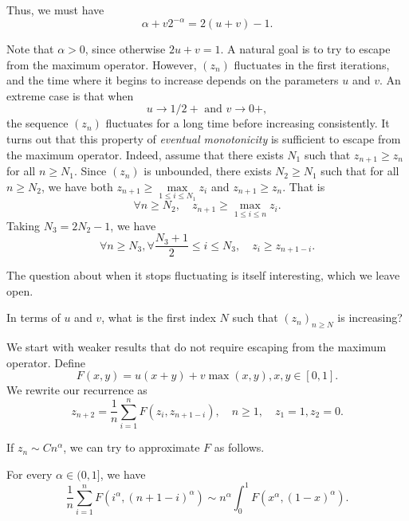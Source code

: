 Thus, we must have
\begin{equation}
  \label{eq:alpha-equation}
  \alpha + v2^{-\alpha} = 2(u+v) - 1.
\end{equation}

Note that $\alpha>0$, since otherwise $2u+v = 1$. A natural goal is to try to escape from the maximum operator. However, $(z_n)$ fluctuates in the first iterations, and the time where it begins to increase depends on the parameters $u$ and $v$. An extreme case is that when
$$u\to1/2+ \text{ and } v\to0+,$$
the sequence $(z_n)$ fluctuates for a long time before increasing consistently. It turns out that this property of \textit{eventual monotonicity} is sufficient to escape from the maximum operator. Indeed, assume that there exists $N_1$ such that $z_{n+1} \ge z_n$ for all $n \ge N_1$. Since $(z_n)$ is unbounded, there exists $N_2 \ge N_1$ such that for all $n \ge N_2$, we have both $z_{n+1} \ge \max\limits_{1\le i \le N_1} z_i$ and $z_{n+1} \ge z_n$. That is
$$\forall n \ge N_2, \quad z_{n+1} \ge \max_{1 \le i \le n} z_i.$$
Taking $N_3 = 2N_2-1$, we have
$$\forall n \ge N_3, \forall \dfrac{N_3+1}{2}\le i \le N_3, \quad z_{i} \ge z_{n+1-i}.$$

The question about when it stops fluctuating is itself interesting, which we leave open.
\begin{openquestion}
  \label{open:when-eventually-increasing}
  In terms of $u$ and $v$, what is the first index $N$ such that $(z_n)_{n\ge N}$ is increasing?
\end{openquestion}

We start with weaker results that do not require escaping from the maximum operator. Define
\begin{equation}
  F(x,y) = u(x+y) + v\max(x,y), x,y\in[0,1].
\end{equation}
We rewrite our recurrence as
\begin{equation}
  z_{n+2} = \dfrac{1}{n}\sum\limits_{i=1}^n F(z_i, z_{n+1-i}), \quad n \ge 1, \quad z_1 = 1, z_2 = 0.
\end{equation}

If $z_n\sim Cn^\alpha$, we can try to approximate $F$ as follows.

\begin{lemma}
  \label{thm:asymptoics-of-history}
  For every $\alpha \in (0,1]$, we have
  $$\dfrac{1}{n}\sum\limits_{i=1}^n F(i^\alpha, (n+1-i)^\alpha) \sim n^\alpha \int_0^1 F(x^\alpha, (1-x)^\alpha).$$
\end{lemma}

